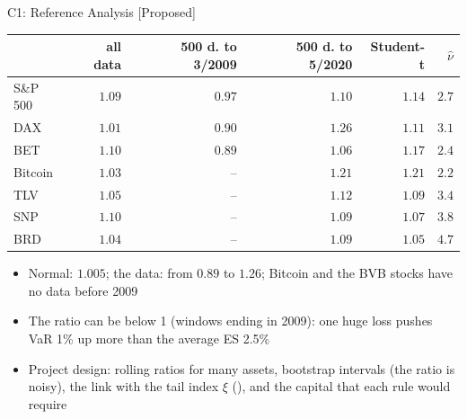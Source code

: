 \ifsolutions
\begin{frame}{C1: Reference Analysis [Proposed]}
\itemsize{\footnotesize}
\begin{center}
\scriptsize
\begin{tabular}{lrrrrr}
\toprule
& all data & 500 d. to 3/2009 & 500 d. to 5/2020 & Student-t & $\hat\nu$ \\
\midrule
S\&P 500 & $1.09$ & $0.97$ & $1.10$ & $1.14$ & $2.7$ \\
DAX & $1.01$ & $0.90$ & $1.26$ & $1.11$ & $3.1$ \\
BET & $1.10$ & $0.89$ & $1.06$ & $1.17$ & $2.4$ \\
Bitcoin & $1.03$ & -- & $1.21$ & $1.21$ & $2.2$ \\
TLV & $1.05$ & -- & $1.12$ & $1.09$ & $3.4$ \\
SNP & $1.10$ & -- & $1.09$ & $1.07$ & $3.8$ \\
BRD & $1.04$ & -- & $1.09$ & $1.05$ & $4.7$ \\
\bottomrule
\end{tabular}
\end{center}
\begin{itemize}
    \item Normal: $1.005$; the data: from $0.89$ to $1.26$; Bitcoin and the BVB stocks have no data before 2009
    \item The ratio can be below 1 (windows ending in 2009): one huge loss pushes VaR 1\% up more than the average ES 2.5\%
    \item Project design: rolling ratios for many assets, bootstrap intervals (the ratio is noisy), the link with the tail index $\xi$ (), and the capital that each rule would require
\end{itemize}
\end{frame}
\fi

